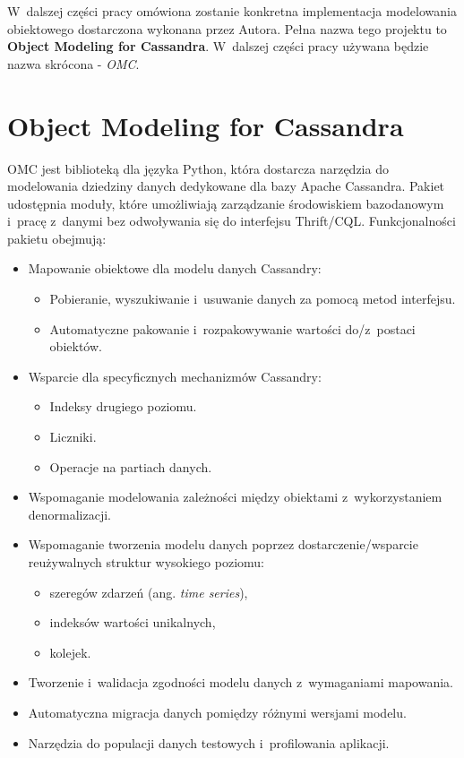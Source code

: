 W~dalszej części pracy omówiona zostanie konkretna implementacja modelowania obiektowego dostarczona wykonana przez Autora. Pełna nazwa tego projektu to \textbf{Object Modeling for Cassandra}. W~dalszej części pracy używana będzie nazwa skrócona - \emph{OMC}.

\section{Object Modeling for Cassandra}
\label{sec:ocm_library_description}

OMC jest biblioteką dla języka Python, która dostarcza narzędzia do modelowania dziedziny danych dedykowane dla bazy Apache Cassandra. Pakiet udostępnia moduły, które umożliwiają zarządzanie środowiskiem bazodanowym i~pracę z~danymi bez odwoływania się do interfejsu Thrift/CQL. Funkcjonalności pakietu obejmują:

\begin{itemize}
	\item Mapowanie obiektowe dla modelu danych Cassandry:
		\begin{itemize}
			\item Pobieranie, wyszukiwanie i~usuwanie danych za pomocą metod interfejsu.
			\item Automatyczne pakowanie i~rozpakowywanie wartości do/z~postaci obiektów.
		\end{itemize}
	\item Wsparcie dla specyficznych mechanizmów Cassandry:
		\begin{itemize}
			\item Indeksy drugiego poziomu.
			\item Liczniki.
			\item Operacje na partiach danych.
		\end{itemize}
	\item Wspomaganie modelowania zależności między obiektami z~wykorzystaniem denormalizacji.
	\item Wspomaganie tworzenia modelu danych poprzez dostarczenie/wsparcie reużywalnych struktur wysokiego poziomu:
		\begin{itemize}
			\item szeregów zdarzeń (ang. \emph{time series}),
			\item indeksów wartości unikalnych,
			\item kolejek.
		\end{itemize}
	\item Tworzenie i~walidacja zgodności modelu danych z~wymaganiami mapowania.
	\item Automatyczna migracja danych pomiędzy różnymi wersjami modelu.
	\item Narzędzia do populacji danych testowych i~profilowania aplikacji. 
\end{itemize}

